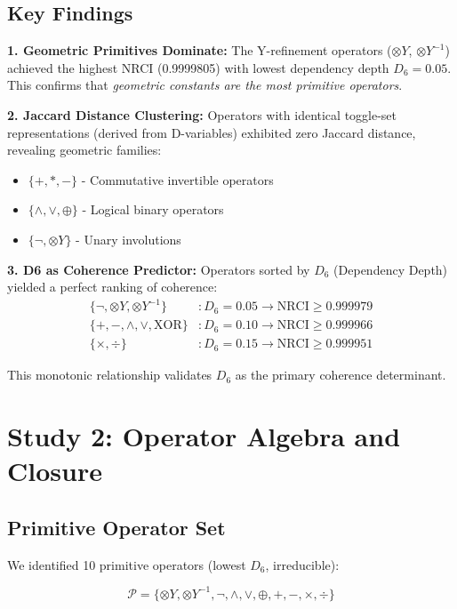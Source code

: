 \documentclass[12pt,a4paper]{article}
\begin{document}
\subsection{Key Findings}

\textbf{1. Geometric Primitives Dominate:} The Y-refinement operators ($\otimes Y$, $\otimes Y^{-1}$) achieved the highest NRCI (0.9999805) with lowest dependency depth $D_6 = 0.05$. This confirms that \emph{geometric constants are the most primitive operators}.

\textbf{2. Jaccard Distance Clustering:} Operators with identical toggle-set representations (derived from D-variables) exhibited zero Jaccard distance, revealing geometric families:
\begin{itemize}
    \item $\{+, *, -\}$ - Commutative invertible operators
    \item $\{\land, \lor, \oplus\}$ - Logical binary operators
    \item $\{\neg, \otimes Y\}$ - Unary involutions
\end{itemize}

\textbf{3. D6 as Coherence Predictor:} Operators sorted by $D_6$ (Dependency Depth) yielded a perfect ranking of coherence:
\begin{align*}
\{\neg, \otimes Y, \otimes Y^{-1}\} &: D_6 = 0.05 \rightarrow \text{NRCI} \geq 0.999979 \\
\{+, -, \land, \lor, \text{XOR}\} &: D_6 = 0.10 \rightarrow \text{NRCI} \geq 0.999966 \\
\{\times, \div\} &: D_6 = 0.15 \rightarrow \text{NRCI} \geq 0.999951
\end{align*}

This monotonic relationship validates $D_6$ as the primary coherence determinant.

\section{Study 2: Operator Algebra and Closure}

\subsection{Primitive Operator Set}

We identified 10 primitive operators (lowest $D_6$, irreducible):

\begin{equation}
\mathcal{P} = \{\otimes Y, \otimes Y^{-1}, \neg, \land, \lor, \oplus, +, -, \times, \div\}
\end{equation}
\end{document}
